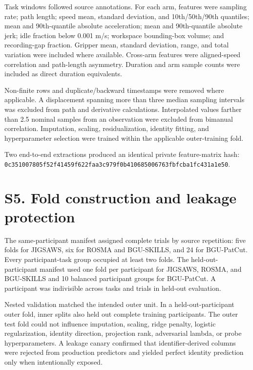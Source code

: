 \documentclass[11pt]{article}
\begin{document}
Task windows followed source annotations. For each arm, features were
sampling rate; path length; speed mean, standard deviation, and
10th/50th/90th quantiles; mean and 90th-quantile absolute acceleration;
mean and 90th-quantile absolute jerk; idle fraction below 0.001 m/s;
workspace bounding-box volume; and recording-gap fraction. Gripper mean,
standard deviation, range, and total variation were included where
available. Cross-arm features were aligned-speed correlation and
path-length asymmetry. Duration and arm sample counts were included as
direct duration equivalents.

Non-finite rows and duplicate/backward timestamps were removed where
applicable. A displacement spanning more than three median sampling
intervals was excluded from path and derivative calculations.
Interpolated values farther than 2.5 nominal samples from an observation
were excluded from bimanual correlation. Imputation, scaling,
residualization, identity fitting, and hyperparameter selection were
trained within the applicable outer-training fold.

Two end-to-end extractions produced an identical private feature-matrix
hash:
\nolinkurl{0c351007805f52f41459f622faa3c979f0b410685006763fbfcba1fc431a1e50}.

\section{S5. Fold construction and leakage
protection}\label{s5.-fold-construction-and-leakage-protection}

The same-participant manifest assigned complete trials by source
repetition: five folds for JIGSAWS, six for ROSMA and BGU-SKILLS, and 24
for BGU-PatCut. Every participant-task group occupied at least two
folds. The held-out-participant manifest used one fold per participant
for JIGSAWS, ROSMA, and BGU-SKILLS and 10 balanced participant groups
for BGU-PatCut. A participant was indivisible across tasks and trials in
held-out evaluation.

Nested validation matched the intended outer unit. In a
held-out-participant outer fold, inner splits also held out complete
training participants. The outer test fold could not influence
imputation, scaling, ridge penalty, logistic regularization, identity
direction, projection rank, adversarial lambda, or probe
hyperparameters. A leakage canary confirmed that identifier-derived
columns were rejected from production predictors and yielded perfect
identity prediction only when intentionally exposed.
\end{document}
